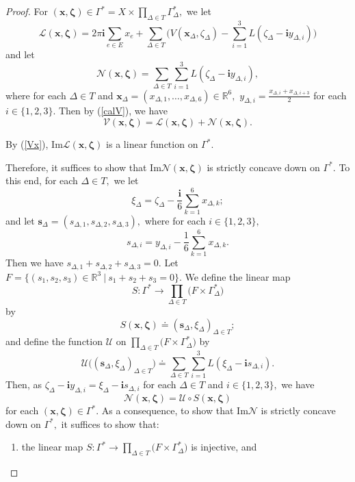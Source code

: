 \documentclass[11pt]{article}
\theoremstyle{remark}
\theoremstyle{remark}
\numberwithin{equation}{section}
\begin{document}
\begin{proof}
For $(\boldsymbol x,\boldsymbol \zeta)\in \Gamma^*=X\times \prod_{\Delta\in T}\Gamma_\Delta^*,$ we let 
$$\mathcal L(\boldsymbol x,\boldsymbol \zeta) = 2\pi \mathbf i \sum_{e\in E}x_e+\sum_{\Delta\in T}\Big(V(\boldsymbol x_\Delta, \zeta_\Delta)-\sum_{i=1}^3L(\zeta_\Delta-\mathbf i y_{\Delta, i})\Big)$$
and let 
$$\mathcal N(\boldsymbol x,\boldsymbol \zeta) = \sum_{\Delta\in T}\sum_{i=1}^3 L(\zeta_\Delta-\mathbf i y_{\Delta, i}),$$
where for each $\Delta\in T$ and $\boldsymbol x_\Delta = (x_{\Delta,1},\dots,x_{\Delta,6})\in \mathbb R^6,$ $y_{\Delta,i}=\frac{x_{\Delta,i}+x_{\Delta,i+3}}{2}$ for each $i\in\{1,2,3\}.$ Then by (\ref{calV}), we have 
$$\mathcal V(\boldsymbol x,\boldsymbol \zeta) = \mathcal L(\boldsymbol x,\boldsymbol \zeta) + \mathcal N(\boldsymbol x,\boldsymbol \zeta). $$


By (\ref{Vx}),  $\mathrm{Im}\mathcal L(\boldsymbol x,\boldsymbol \zeta)$ is a linear function on $\Gamma^*.$ 
\medskip

Therefore,  it suffices to show that $\mathrm{Im}\mathcal N(\boldsymbol x,\boldsymbol \zeta)$ is strictly concave down  on $\Gamma^*.$ 
To this end, for each $\Delta\in T,$ we let 
$$\xi_\Delta = \zeta_\Delta - \frac{\mathbf i}{6}\sum_{k=1}^6x_{\Delta,k};$$ and let 
$\boldsymbol s_\Delta= (s_{\Delta,1},s_{\Delta,2},s_{\Delta,3}),$ 
where for each $i\in\{1,2,3\},$ 
$$s_{\Delta,i}=y_{\Delta,i}-\frac{1}{6}\sum_{k=1}^6x_{\Delta,k}.$$
Then we have 
$s_{\Delta,1}+s_{\Delta,2}+s_{\Delta,3}=0.$ 
Let $F=\big\{(s_1,s_2,s_3)\in\mathbb R^3\ \big|\ s_1+s_2+s_3=0\big\}.$ We define the linear map 
$$S: \Gamma^* \to \prod_{\Delta \in T} \big(F\times \Gamma_\Delta^*\big)$$
by 
$$S(\boldsymbol x,\boldsymbol \zeta)\doteq (\boldsymbol s_\Delta, \xi_\Delta)_{\Delta\in T};$$
and define the function $\mathcal U$ on $\prod_{\Delta \in T} \big(F\times \Gamma_\Delta^*\big)$ by
$$\mathcal U\Big((\boldsymbol s_\Delta,\xi_\Delta)_{\Delta\in T}\Big)\doteq \sum_{\Delta\in T}\sum_{i=1}^3L(\xi_\Delta-\mathbf i s_{\Delta,i}).$$
Then, as $\zeta_\Delta-\mathbf i y_{\Delta,i}=\xi_\Delta-\mathbf i s_{\Delta,i}$ for each $\Delta\in T$ and $i\in\{1,2,3\},$
we have 
$$\mathcal N(\boldsymbol x,\boldsymbol \zeta)= \mathcal U \circ S (\boldsymbol x,\boldsymbol \zeta)$$
for each $(\boldsymbol x,\boldsymbol \zeta)\in \Gamma^*.$ As a consequence, to show that $\mathrm{Im}\mathcal N$ is strictly concave down on $\Gamma^*,$ it suffices to show that:
\begin{enumerate}[(1)]
    \item the linear map 
$S: \Gamma^* \to \prod_{\Delta \in T} \big(F\times \Gamma_\Delta^*\big)$ is injective, and 



\end{enumerate}
\end{proof}
\end{document}
